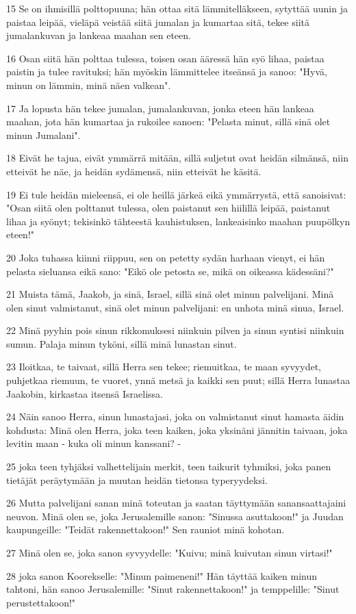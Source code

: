 \par 15 Se on ihmisillä polttopuuna; hän ottaa sitä lämmitelläkseen, sytyttää uunin ja paistaa leipää, vieläpä veistää siitä jumalan ja kumartaa sitä, tekee siitä jumalankuvan ja lankeaa maahan sen eteen.
\par 16 Osan siitä hän polttaa tulessa, toisen osan ääressä hän syö lihaa, paistaa paistin ja tulee ravituksi; hän myöskin lämmittelee itseänsä ja sanoo: "Hyvä, minun on lämmin, minä näen valkean".
\par 17 Ja lopusta hän tekee jumalan, jumalankuvan, jonka eteen hän lankeaa maahan, jota hän kumartaa ja rukoilee sanoen: "Pelasta minut, sillä sinä olet minun Jumalani".
\par 18 Eivät he tajua, eivät ymmärrä mitään, sillä suljetut ovat heidän silmänsä, niin etteivät he näe, ja heidän sydämensä, niin etteivät he käsitä.
\par 19 Ei tule heidän mieleensä, ei ole heillä järkeä eikä ymmärrystä, että sanoisivat: "Osan siitä olen polttanut tulessa, olen paistanut sen hiilillä leipää, paistanut lihaa ja syönyt; tekisinkö tähteestä kauhistuksen, lankeaisinko maahan puupölkyn eteen!"
\par 20 Joka tuhassa kiinni riippuu, sen on petetty sydän harhaan vienyt, ei hän pelasta sieluansa eikä sano: "Eikö ole petosta se, mikä on oikeassa kädessäni?"
\par 21 Muista tämä, Jaakob, ja sinä, Israel, sillä sinä olet minun palvelijani. Minä olen sinut valmistanut, sinä olet minun palvelijani: en unhota minä sinua, Israel.
\par 22 Minä pyyhin pois sinun rikkomuksesi niinkuin pilven ja sinun syntisi niinkuin sumun. Palaja minun tyköni, sillä minä lunastan sinut.
\par 23 Iloitkaa, te taivaat, sillä Herra sen tekee; riemuitkaa, te maan syvyydet, puhjetkaa riemuun, te vuoret, ynnä metsä ja kaikki sen puut; sillä Herra lunastaa Jaakobin, kirkastaa itsensä Israelissa.
\par 24 Näin sanoo Herra, sinun lunastajasi, joka on valmistanut sinut hamasta äidin kohdusta: Minä olen Herra, joka teen kaiken, joka yksinäni jännitin taivaan, joka levitin maan - kuka oli minun kanssani? -
\par 25 joka teen tyhjäksi valhettelijain merkit, teen taikurit tyhmiksi, joka panen tietäjät peräytymään ja muutan heidän tietonsa typeryydeksi.
\par 26 Mutta palvelijani sanan minä toteutan ja saatan täyttymään sanansaattajaini neuvon. Minä olen se, joka Jerusalemille sanon: "Sinussa asuttakoon!" ja Juudan kaupungeille: "Teidät rakennettakoon!" Sen rauniot minä kohotan.
\par 27 Minä olen se, joka sanon syvyydelle: "Kuivu; minä kuivutan sinun virtasi!"
\par 28 joka sanon Koorekselle: "Minun paimeneni!" Hän täyttää kaiken minun tahtoni, hän sanoo Jerusalemille: "Sinut rakennettakoon!" ja temppelille: "Sinut perustettakoon!"

